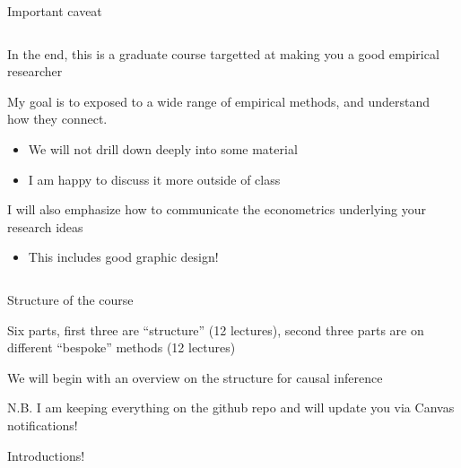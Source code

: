 \documentclass[notes,11pt, aspectratio=169]{beamer}
\newenvironment{wideitemize}{\itemize\addtolength{\itemsep}{10pt}}{\enditemize}
\begin{document}
\begin{frame}{Important caveat}
\begin{columns}[T] %
\begin{column}{.7\textwidth}
  \begin{wideitemize}
  \item In the end, this is a graduate course targetted at making you a good empirical researcher
  \item My goal is to exposed to a wide range of empirical methods,
    and understand how they connect.
    \begin{itemize}
    \item We will not drill down deeply into some material
    \item I am happy to discuss it more outside of class
    \end{itemize}
  \item I will also emphasize how to communicate the econometrics underlying your research ideas
    \begin{itemize}
    \item This includes good graphic design!
    \end{itemize}
  \end{wideitemize}
\end{column}%
\hfill%
\begin{column}{.38\textwidth}
  \makebox[\linewidth][c]{
    \resizebox{\linewidth}{!}{
    }
  }
\end{column}%
\end{columns}
\end{frame}


\begin{frame}{Structure of the course}
  \begin{wideitemize}
  \item Six parts, first three are ``structure'' (12 lectures), second
    three parts are on different ``bespoke'' methods (12 lectures)
  \item We will begin with an overview on the structure for causal inference
  \item N.B. I am keeping everything on the github repo and will
    update you via Canvas notifications!
  \end{wideitemize}
\end{frame}


\begin{frame}{Introductions!}
\end{frame}
\end{document}
